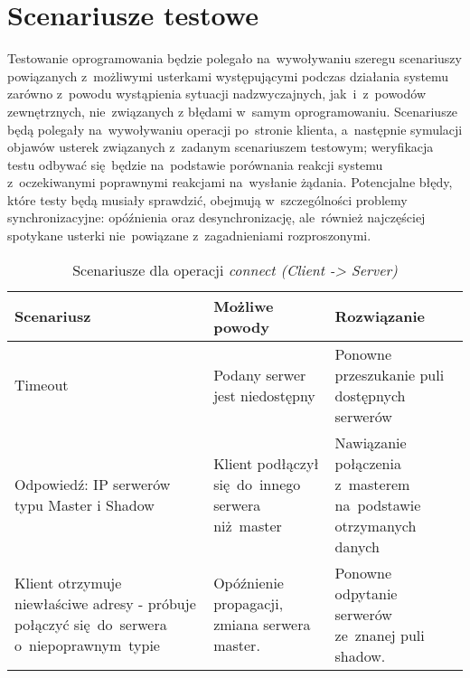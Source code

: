 \chapter[Scenariusze testowe][Scenariusze testowe]{Scenariusze testowe}
Testowanie oprogramowania będzie polegało na~wywoływaniu szeregu scenariuszy
powiązanych z~możliwymi usterkami występującymi podczas działania systemu
zarówno z~powodu wystąpienia sytuacji nadzwyczajnych, jak~i~z~powodów
zewnętrznych, nie~związanych z błędami w~samym oprogramowaniu. Scenariusze będą
polegały na~wywoływaniu operacji po~stronie klienta, a~następnie symulacji
objawów usterek związanych z~zadanym scenariuszem testowym; weryfikacja testu
odbywać się~będzie na~podstawie porównania reakcji systemu z~oczekiwanymi
poprawnymi reakcjami na~wysłanie żądania. Potencjalne błędy, które testy będą
musiały sprawdzić, obejmują w~szczególności problemy synchronizacyjne:
opóźnienia oraz desynchronizację, ale~również najczęściej spotykane usterki
nie~powiązane z~zagadnieniami rozproszonymi.

\begin{table}[h]
\begin{center}
	\begin{tabular}{|p{4cm} | p{4cm} | p{6cm} |}
		\hline
		\textbf{Scenariusz} & \textbf{Możliwe powody} &	\textbf{Rozwiązanie}	\\	\hline
		Timeout             & Podany serwer jest niedostępny &	Ponowne przeszukanie
		puli dostępnych serwerów \\ \hline
		Odpowiedź: IP serwerów typu Master i Shadow & Klient podłączył się~do~innego
		serwera niż~master & Nawiązanie połączenia z~masterem na~podstawie otrzymanych
		danych \\ \hline
		Klient otrzymuje niewłaściwe adresy - próbuje połączyć się~do~serwera
		o~niepoprawnym~typie & Opóźnienie propagacji, zmiana serwera master.
		& Ponowne odpytanie serwerów ze~znanej puli shadow. \\ \hline
	\end{tabular}
\end{center}
\caption{Scenariusze dla operacji \emph{connect (Client -> Server)}}
\end{table}

